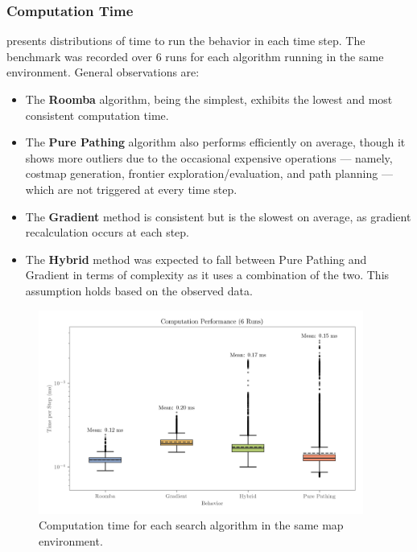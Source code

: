\subsubsection{Computation Time}
 presents distributions of time to run the behavior in each time step. The benchmark was recorded over 6 runs for each algorithm running in the same environment. General observations are:

\begin{itemize}
  \item The \textbf{Roomba} algorithm, being the simplest, exhibits the lowest and most consistent computation time.
  \item The \textbf{Pure Pathing} algorithm also performs efficiently on average, though it shows more outliers due to the occasional expensive operations --- namely, costmap generation, frontier exploration/evaluation, and path planning --- which are not triggered at every time step.
  \item The \textbf{Gradient} method is consistent but is the slowest on average, as gradient recalculation occurs at each step.
  \item The \textbf{Hybrid} method was expected to fall between Pure Pathing and Gradient in terms of complexity as it uses a combination of the two. This assumption holds based on the observed data.
\end{itemize}

\begin{figure}[H]
    \begin{center}
        \includegraphics[width=0.95\textwidth]{./figures/plots/computation-performance-(6-runs).png}
    \end{center}
    \caption{Computation time for each search algorithm in the same map environment.}
    \label{fig:computation-performance}
\end{figure}

